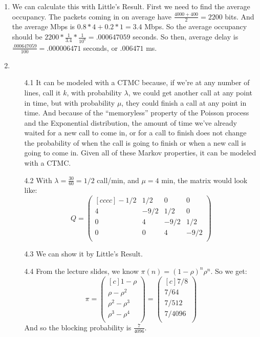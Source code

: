 \begin{enumerate}
\begin{enumerate}
    \end{enumerate}
  \item We can calculate this with Little's Result. First we need to find the average occupancy. The packets coming in on average have $\frac{4000+400}{2} = 2200$ bits. And the average Mbps is $0.8*4 + 0.2*1 = 3.4$ Mbps. So the average occupancy should be $2200 * \frac{1}{3.4} * \frac{1}{10^6} = .000647059$ seconds. So then, average delay is $\frac{.000647059}{100} = .000006471$ seconds, or $.006471$ ms.

  \item 
    \begin{enumerate}
      \item [4.1] It can be modeled with a CTMC because, if we're at any number of lines, call it $k$, with probability $\lambda$, we could get another call at any point in time, but with probability $\mu$, they could finish a call at any point in time. And because of the ``memoryless'' property of the Poisson process and the Exponential distribution, the amount of time we've already waited for a new call to come in, or for a call to finish does not change the probability of when the call is going to finish or when a new call is going to come in. Given all of these Markov properties, it can be modeled with a CTMC.

      \item [4.2] With $\lambda = \frac{30}{60} = 1/2$ call/min, and $\mu = 4$ min, the matrix would look like:
    $$Q =       
    \begin{pmatrix}[cccc]
        -1/2 & 1/2 & 0 & 0\\
        4 & -9/2 & 1/2 & 0\\
        0 & 4 & -9/2 & 1/2\\
        0 & 0 & 4 & -9/2\\
      \end{pmatrix}
    $$
      
      \item [4.3] We can show it by Little's Result.
      \item [4.4] From the lecture slides, we know $\pi(n) = (1-\rho)^n \rho^n$. So we get:
        $$\pi = 
        \begin{pmatrix}[c]
          1 - \rho\\
          \rho - \rho^2\\
          \rho^2 - \rho^3\\
          \rho^3 - \rho^4\\
        \end{pmatrix}
        =
        \begin{pmatrix}[c]
          7/8\\
          7/64\\
          7/512\\
          7/4096\\
        \end{pmatrix}
        $$
        And so the blocking probability is $\frac{7}{4096}$.


\end{enumerate}
\end{enumerate}
